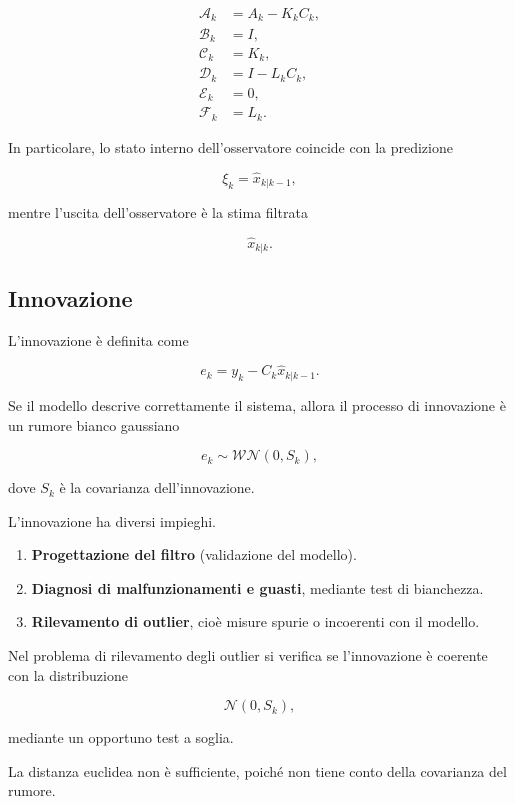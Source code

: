 \documentclass[11pt,a4paper]{article}
\begin{document}
\[
\boxed{
\begin{aligned}
\mathcal{A}_k &= A_k-K_kC_k,\\
\mathcal{B}_k &= I,\\
\mathcal{C}_k &= K_k,\\
\mathcal{D}_k &= I-L_kC_k,\\
\mathcal{E}_k &= 0,\\
\mathcal{F}_k &= L_k.
\end{aligned}
}
\]

In particolare, lo stato interno dell'osservatore coincide con la predizione

\[
\boxed{
\xi_k=\hat{x}_{k|k-1},
}
\]

mentre l'uscita dell'osservatore è la stima filtrata

\[
\boxed{
\hat{x}_{k|k}.
}
\]

\subsection*{Innovazione}

L'innovazione è definita come

\[
\boxed{
e_k
=
y_k-C_k\hat{x}_{k|k-1}.
}
\]

Se il modello descrive correttamente il sistema, allora il processo di innovazione è un rumore bianco gaussiano

\[
\boxed{
e_k\sim\mathcal{WN}(0,S_k),
}
\]

dove \(S_k\) è la covarianza dell'innovazione.

L'innovazione ha diversi impieghi.

\begin{enumerate}
    \item \textbf{Progettazione del filtro} (validazione del modello).

    \item \textbf{Diagnosi di malfunzionamenti e guasti}, mediante test di bianchezza.

    \item \textbf{Rilevamento di outlier}, cioè misure spurie o incoerenti con il modello.
\end{enumerate}

Nel problema di rilevamento degli outlier si verifica se l'innovazione è coerente con la distribuzione

\[
\mathcal N(0,S_k),
\]

mediante un opportuno test a soglia.

La distanza euclidea non è sufficiente, poiché non tiene conto della covarianza del rumore.
\end{document}

